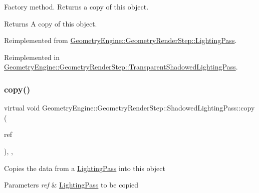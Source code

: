 Factory method. Returns a copy of this object. \begin{DoxyReturn}{Returns}
A copy of this object. 
\end{DoxyReturn}


Reimplemented from \mbox{\hyperlink{class_geometry_engine_1_1_geometry_render_step_1_1_lighting_pass_a4f1cb36c7bf6a90d0aa3b8e8feba5e5e}{Geometry\+Engine\+::\+Geometry\+Render\+Step\+::\+Lighting\+Pass}}.



Reimplemented in \mbox{\hyperlink{class_geometry_engine_1_1_geometry_render_step_1_1_transparent_shadowed_lighting_pass_a56d2ef131669ae3964a04cb54e6c3b0f}{Geometry\+Engine\+::\+Geometry\+Render\+Step\+::\+Transparent\+Shadowed\+Lighting\+Pass}}.

\mbox{\label{class_geometry_engine_1_1_geometry_render_step_1_1_shadowed_lighting_pass_add7b889c49a68911f675ee44ab656699}} 
\subsubsection{\texorpdfstring{copy()}{copy()}}
{\footnotesize\ttfamily virtual void Geometry\+Engine\+::\+Geometry\+Render\+Step\+::\+Shadowed\+Lighting\+Pass\+::copy (\begin{DoxyParamCaption}\item[{const \mbox{\hyperlink{class_geometry_engine_1_1_geometry_render_step_1_1_shadowed_lighting_pass}{Shadowed\+Lighting\+Pass}} \&}]{ref }\end{DoxyParamCaption})\hspace{0.3cm}{\ttfamily [inline]}, {\ttfamily [protected]}, {\ttfamily [virtual]}}

Copies the data from a \mbox{\hyperlink{class_geometry_engine_1_1_geometry_render_step_1_1_lighting_pass}{Lighting\+Pass}} into this object 
\begin{DoxyParams}{Parameters}
{\em ref} & \mbox{\hyperlink{class_geometry_engine_1_1_geometry_render_step_1_1_lighting_pass}{Lighting\+Pass}} to be copied \\
\hline
\end{DoxyParams}


